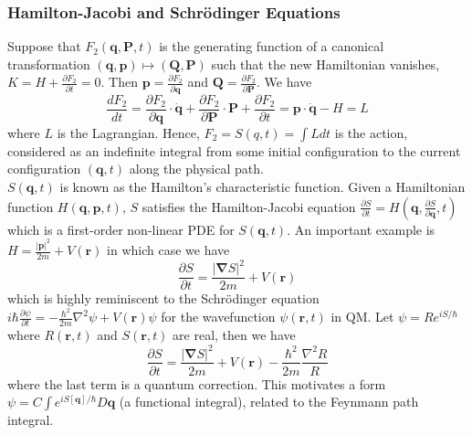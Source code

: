 \documentclass[a4paper]{article}
\theoremstyle{new}
\begin{document}
\subsubsection*{Hamilton-Jacobi and Schr\"{o}dinger Equations}
Suppose that $F_2(\mathbf{q},\mathbf{P},t)$ is the generating function of a canonical transformation $(\mathbf{q},\mathbf{p})\mapsto(\mathbf{Q},\mathbf{P})$ such that the new Hamiltonian vanishes, $K=H+\frac{\partial F_2}{\partial t}=0$. Then $\mathbf{p}=\frac{\partial F_2}{\partial\mathbf{q}}$ and $\mathbf{Q}=\frac{\partial F_2}{\partial\mathbf{P}}$. We have
$$\frac{dF_2}{dt}=\frac{\partial F_2}{\partial\mathbf{q}}\cdot\mathbf{\dot{q}}+\frac{\partial F_2}{\partial\mathbf{P}}\cdot\mathbf{P}+\frac{\partial F_2}{\partial t}=\mathbf{p}\cdot\mathbf{\dot{q}}-H=L$$
where $L$ is the Lagrangian. Hence, $F_2=S(q,t)=\int Ldt$ is the action, considered as an indefinite integral from some initial configuration to the current configuration $(\mathbf{q},t)$ along the physical path.\\[5pt]
$S(\mathbf{q},t)$ is known as the Hamilton's characteristic function. Given a Hamiltonian function $H(\mathbf{q},\mathbf{p},t)$, $S$ satisfies the Hamilton-Jacobi equation $\frac{\partial S}{\partial t}=H(\mathbf{q},\frac{\partial S}{\partial\mathbf{q}},t)$ which is a first-order non-linear PDE for $S(\mathbf{q},t)$. An important example is $H=\frac{|\mathbf{p}|^2}{2m}+V(\mathbf{r})$ in which case we have
$$\frac{\partial S}{\partial t}=\frac{|\boldsymbol{\nabla}S|^2}{2m}+V(\mathbf{r})$$
which is highly reminiscent to the Schr\"{o}dinger equation $i\hbar\frac{\partial\psi}{\partial t}=-\frac{\hbar^2}{2m}\nabla^2\psi+V(\mathbf{r})\psi$ for the wavefunction $\psi(\mathbf{r},t)$ in QM. Let $\psi=Re^{iS/\hbar}$ where $R(\mathbf{r},t)$ and $S(\mathbf{r},t)$ are real, then we have
$$\frac{\partial S}{\partial t}=\frac{|\boldsymbol{\nabla}S|^2}{2m}+V(\mathbf{r})-\frac{\hbar^2}{2m}\frac{\nabla^2R}{R}$$
where the last term is a quantum correction. This motivates a form $\psi=C\int e^{iS[\mathbf{q}]/\hbar}D\mathbf{q}$ (a functional integral), related to the Feynmann path integral.
\end{document}
